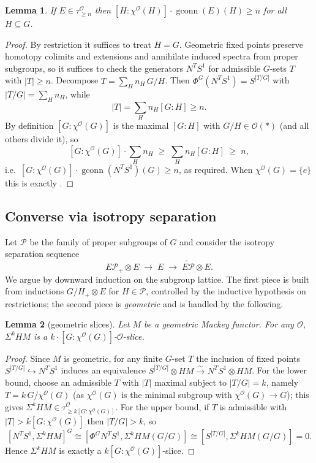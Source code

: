 \documentclass[11pt]{article}
\newcommand{\aO}{\mathcal{O}}
\newcommand{\gconn}{\operatorname{gconn}}
\newtheorem{lemma}{Lemma}
\theoremstyle{definition}
\begin{document}
\begin{lemma}\label{lem:forward}
If $E\in\tau^\aO_{\ge n}$ then $[H:\chi^\aO(H)]\cdot\gconn(E)(H)\ge n$ for all
$H\subseteq G$.
\end{lemma}

\begin{proof}
By restriction it suffices to treat $H=G$. Geometric fixed points preserve
homotopy colimits and extensions and annihilate induced spectra from proper
subgroups, so it suffices to check the generators $N^T S^1$ for admissible
$G$-sets $T$ with $|T|\ge n$. Decompose $T=\sum_H n_H\, G/H$. Then
$\Phi^G(N^T S^1)=S^{|T/G|}$ with $|T/G|=\sum_H n_H$, while
\[
|T|=\sum_H n_H[G:H]\ge n .
\]
By definition $[G:\chi^\aO(G)]$ is the maximal $[G:H]$ with $G/H\in\aO(\ast)$
(and all others divide it), so
\[
[G:\chi^\aO(G)]\cdot\sum_H n_H \;\ge\; \sum_H n_H[G:H]\;\ge\; n,
\]
i.e.\ $[G:\chi^\aO(G)]\cdot\gconn(N^T S^1)(G)\ge n$, as required. When
$\chi^\aO(G)=\{e\}$ this is exactly \cite[Thm.~2.5]{HY18}.
\end{proof}

\subsection*{Converse via isotropy separation}

Let $\mathcal P$ be the family of proper subgroups of $G$ and consider the
isotropy separation sequence
\[
E\mathcal P_+\otimes E\;\longrightarrow\; E\;\longrightarrow\;
\widetilde{E\mathcal P}\otimes E .
\]
We argue by downward induction on the subgroup lattice. The first piece is built
from inductions $G/H_+\otimes E$ for $H\in\mathcal P$, controlled by the
inductive hypothesis on restrictions; the second piece is \emph{geometric} and
is handled by the following.

\begin{lemma}[geometric slices]\label{lem:geom}
Let $M$ be a geometric Mackey functor. For any $\aO$,
$\Sigma^k HM$ is a $k\cdot[G:\chi^\aO(G)]$-$\aO$-slice.
\end{lemma}

\begin{proof}
Since $M$ is geometric, for any finite $G$-set $T$ the inclusion of fixed points
$S^{|T/G|}\hookrightarrow N^T S^1$ induces an equivalence
$S^{|T/G|}\otimes HM\xrightarrow{\sim} N^T S^1\otimes HM$. For the lower bound,
choose an admissible $T$ with $|T|$ maximal subject to $|T/G|=k$, namely
$T=k\,G/\chi^\aO(G)$ (as $\chi^\aO(G)$ is the minimal subgroup with
$\chi^\aO(G)\to G$); this gives $\Sigma^k HM\in\tau^\aO_{\ge k[G:\chi^\aO(G)]}$.
For the upper bound, if $T$ is admissible with $|T|>k[G:\chi^\aO(G)]$ then
$|T/G|>k$, so
\[
[N^T S^1,\Sigma^k HM]^G\cong[\Phi^G N^T S^1,\Sigma^k HM(G/G)]
\cong[S^{|T/G|},\Sigma^k HM(G/G)]=0 .
\]
Hence $\Sigma^k HM$ is exactly a $k[G:\chi^\aO(G)]$-slice.
\end{proof}
\end{document}
